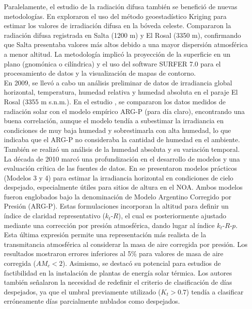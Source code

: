 Paralelamente, el estudio de la radiación difusa también se benefició de nuevas metodologías. En \cite{Salazar2008b} exploraron el uso del método geoestadístico Kriging \citep{Krige1951}  para estimar los valores de irradiación difusa en la bóveda celeste. Compararon la radiación difusa registrada en Salta (1200 m) y El Rosal (3350 m), confirmando que Salta presentaba valores más altos debido a una mayor dispersión atmosférica a menor altitud. La metodología implicó la proyección de la superficie en un plano (gnomónica o cilíndrica) y el uso del software SURFER 7.0 para el procesamiento de datos y la visualización de mapas de contorno.\\

En 2009, se llevó a cabo un análisis preliminar de datos de irradiancia global horizontal, temperatura, humedad relativa y humedad absoluta en el paraje El Rosal (3355 m s.n.m.). En el estudio \cite{Salazar2009}, se compararon los datos medidos de radiación solar con el modelo empírico ARG-P (para día claro), encontrando una buena correlación, aunque el modelo tendía a subestimar la irradiancia en condiciones de muy baja humedad y sobrestimarla con alta humedad, lo que indicaba que el ARG-P no consideraba la cantidad de humedad en el ambiente. También se realizó un análisis de la humedad absoluta y su variación temporal.\\

La década de 2010 marcó una profundización en el desarrollo de modelos y una evaluación crítica de las fuentes de datos. En \cite{Salazar2010a} se presentaron modelos prácticos (Modelos 3 y 4) para estimar la irradiancia horizontal en condiciones de cielo despejado, especialmente útiles para sitios de altura en el NOA. Ambos modelos fueron englobados bajo la denominación de Modelo Argentino Corregido por Presión (ARG-P). Estas formulaciones incorporan la altitud para definir un índice de claridad representativo ($k_t\text{-}R$), el cual es posteriormente ajustado mediante una corrección por presión atmosférica, dando lugar al índice $k_t\text{-}R\text{-}p$. Esta última expresión permite una representación más realista de la transmitancia atmosférica al considerar la masa de aire corregida por presión. Los resultados mostraron errores inferiores al 5\% para valores de masa de aire corregida ($AM_c < 2$). Asimismo, se destacó su potencial para estudios de factibilidad en la instalación de plantas de energía solar térmica. Los autores también señalaron la necesidad de redefinir el criterio de clasificación de días despejados, ya que el umbral previamente utilizado ($K_t > 0.7$) tendía a clasificar erróneamente días parcialmente nublados como despejados.\\

